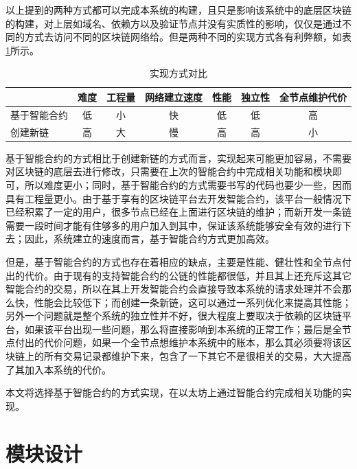 以上提到的两种方式都可以完成本系统的构建，且只是影响该系统中的底层区块链的构建，对上层如域名、依赖方以及验证节点并没有实质性的影响，仅仅是通过不同的方式去访问不同的区块链网络给。但是两种不同的实现方式各有利弊额，如表\ref{cmpMethod}所示。

\begin{table}[h] \label{cmpMethod}%
\caption{实现方式对比} %
\begin{tabular}{l*{6}{c}} %
\hline  
\hline  
  & 难度 & 工程量 & 网络建立速度 & 性能 & 独立性 & 全节点维护代价 \\ %
\hline %
基于智能合约 & 低 & 小 & 快 & 低 & 低 & 高 \\
\hline  
创建新链 & 高 & 大 & 慢 & 高 & 高 & 小 \\
 
\hline  
\hline  
\end{tabular}  
\end{table}  

基于智能合约的方式相比于创建新链的方式而言，实现起来可能更加容易，不需要对区块链的底层去进行修改，只需要在上次的智能合约中完成相关功能和模块即可，所以难度更小；同时，基于智能合约的方式需要书写的代码也要少一些，因而具有工程量更小。由于基于享有的区块链平台去开发智能合约，该平台一般情况下已经积累了一定的用户，很多节点已经在上面进行区块链的维护；而新开发一条链需要一段时间才能有住够多的用户加入到其中，保证该系统能够安全有效的进行下去；因此，系统建立的速度而言，基于智能合约方式更加高效。

但是，基于智能合约的方式也存在着相应的缺点，主要是性能、健壮性和全节点付出的代价。由于现有的支持智能合约的公链的性能都很低，并且其上还充斥这其它智能合约的交易，所以在其上开发智能合约会直接导致本系统的请求处理并不会那么快，性能会比较低下；而创建一条新链，这可以通过一系列优化来提高其性能；另外一个问题就是整个系统的独立性并不好，很大程度上要取决于依赖的区块链平台，如果该平台出现一些问题，那么将直接影响到本系统的正常工作；最后是全节点付出的代价问题，如果一个全节点想维护本系统中的账本，那么其必须要将该区块链上的所有交易记录都维护下来，包含了一下其它不是很相关的交易，大大提高了其加入本系统的代价。

本文将选择基于智能合约的方式实现，在以太坊上通过智能合约完成相关功能的实现。



\section{模块设计}


